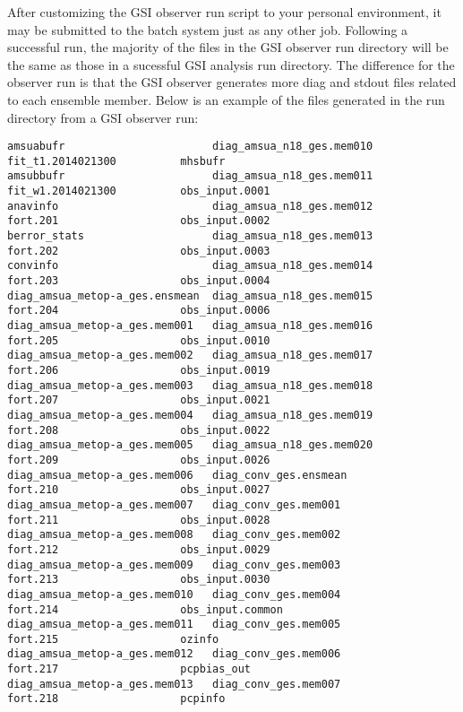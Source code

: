 After customizing the GSI observer run script to your personal environment, it may be submitted to the batch system just as any other job.
Following a successful run, the majority of the files in the GSI observer run directory will be the same as those in a sucessful GSI analysis run directory. The difference for the observer run is that the GSI observer generates more diag and stdout files related to each ensemble member. Below is an example of the files generated in the run directory from a GSI observer run:
\begin{scriptsize}
\begin{verbatim}
amsuabufr                       diag_amsua_n18_ges.mem010       fit_t1.2014021300          mhsbufr
amsubbufr                       diag_amsua_n18_ges.mem011       fit_w1.2014021300          obs_input.0001
anavinfo                        diag_amsua_n18_ges.mem012       fort.201                   obs_input.0002
berror_stats                    diag_amsua_n18_ges.mem013       fort.202                   obs_input.0003
convinfo                        diag_amsua_n18_ges.mem014       fort.203                   obs_input.0004
diag_amsua_metop-a_ges.ensmean  diag_amsua_n18_ges.mem015       fort.204                   obs_input.0006
diag_amsua_metop-a_ges.mem001   diag_amsua_n18_ges.mem016       fort.205                   obs_input.0010
diag_amsua_metop-a_ges.mem002   diag_amsua_n18_ges.mem017       fort.206                   obs_input.0019
diag_amsua_metop-a_ges.mem003   diag_amsua_n18_ges.mem018       fort.207                   obs_input.0021
diag_amsua_metop-a_ges.mem004   diag_amsua_n18_ges.mem019       fort.208                   obs_input.0022
diag_amsua_metop-a_ges.mem005   diag_amsua_n18_ges.mem020       fort.209                   obs_input.0026
diag_amsua_metop-a_ges.mem006   diag_conv_ges.ensmean           fort.210                   obs_input.0027
diag_amsua_metop-a_ges.mem007   diag_conv_ges.mem001            fort.211                   obs_input.0028
diag_amsua_metop-a_ges.mem008   diag_conv_ges.mem002            fort.212                   obs_input.0029
diag_amsua_metop-a_ges.mem009   diag_conv_ges.mem003            fort.213                   obs_input.0030
diag_amsua_metop-a_ges.mem010   diag_conv_ges.mem004            fort.214                   obs_input.common
diag_amsua_metop-a_ges.mem011   diag_conv_ges.mem005            fort.215                   ozinfo
diag_amsua_metop-a_ges.mem012   diag_conv_ges.mem006            fort.217                   pcpbias_out
diag_amsua_metop-a_ges.mem013   diag_conv_ges.mem007            fort.218                   pcpinfo

\end{verbatim}
\end{scriptsize}
